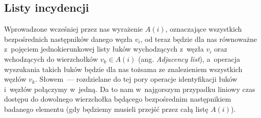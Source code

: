 \subsection{Listy incydencji}



Wprowadzone wcześniej przez nas wyrażenie $A \left( i \right)$, oznaczające wszystkich bezpośrednich następników danego węzła $v_{i}$, od teraz będzie dla nas równoważne z~pojęciem jednokierunkowej listy łuków wychodzących z~węzła $v_{i}$ oraz wchodzących do wierzchołków $v_{k} \in A \left( i \right)$ (ang. \textit{Adjacency list}), a~operacja wyszukania takich łuków będzie dla nas tożsama ze znalezieniem wszystkich węzłów $v_{k}$.
Słowem~--- rozdzielane do tej pory operacje identyfikacji łuków i~węzłów połączymy w~jedną. Da to nam w~najgorszym przypadku liniowy czas dostępu do dowolnego wierzchołka będącego bezpośrednim następnikiem badanego elementu (gdy będziemy musieli przejść przez całą listę $A \left( i \right)$). 

